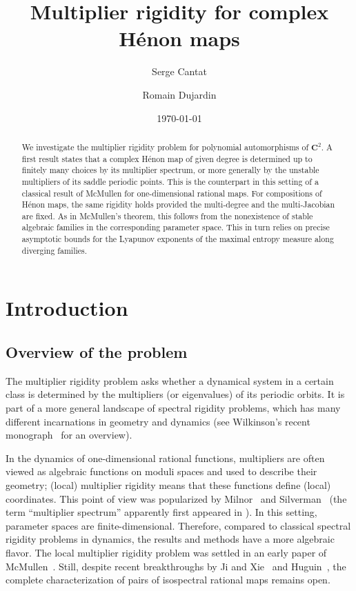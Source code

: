 \documentclass[oneside, 12pt]{amsart}
\title{Multiplier rigidity for complex Hénon maps}
\date{\today}
\author{Serge Cantat}
\author{Romain Dujardin}
\newcommand{\C}{\mathbf{C}}
\theoremstyle{plain}
\theoremstyle{definition}
\numberwithin{equation}{section}       %
\numberwithin{equation}{section}       %
\begin{document}
\setlength{\parskip}{.2em}
\setlength{\baselineskip}{1.26em}  


\begin{abstract}
We investigate the multiplier rigidity problem for polynomial automorphisms of $\C^2$.  
A first result states   that a 
complex Hénon map of given degree  is determined up to finitely many choices by its multiplier 
spectrum, or more generally by the unstable multipliers of its saddle periodic points. This is the counterpart in this setting of a classical result of McMullen for one-dimensional rational maps.
For compositions of 
Hénon maps, the same rigidity holds provided the multi-degree and the multi-Jacobian are fixed. 
As in McMullen’s theorem, this follows from the nonexistence of stable algebraic families in the corresponding parameter space. This  in turn relies on precise asymptotic bounds for the Lyapunov exponents of the maximal entropy measure along diverging families.
\end{abstract} 



\maketitle

\setcounter{tocdepth}{1}
\tableofcontents 

\section{Introduction}

\subsection{Overview of the problem}
The multiplier rigidity problem 
asks whether a dynamical system in a certain class  is determined by the 
multipliers (or eigenvalues) of its periodic orbits. It is part of a more general landscape 
 of spectral rigidity problems, which has many different  incarnations in geometry and dynamics (see 
Wilkinson's  recent monograph~\cite{wilkinson:book} for an overview). 

In the dynamics of one-dimensional rational functions, multipliers are often viewed as algebraic
  functions on moduli spaces and used to describe their geometry; %
  (local) 
  multiplier rigidity means that these functions define (local) coordinates.
     This point of view was %
     popularized by Milnor~\cite{milnor:quadratic, milnor:two_critical} 
 and Silverman~\cite{silverman:book} (the term ``multiplier spectrum'' apparently first appeared in 
 \cite{milnor:lattes}). 
 In this setting, parameter spaces are   finite-dimensional. Therefore, 
 compared to classical spectral rigidity problems  in dynamics, the results and 
 methods have a more algebraic flavor. The  local multiplier rigidity problem
 was settled in an early paper of McMullen~\cite{mcm:algorithms}.
  Still, despite   recent breakthroughs by Ji and Xie~\cite{ji-xie:multipliers, ji-xie:injective} 
  and Huguin~\cite{huguin:polynomials}, the complete characterization of pairs of isospectral 
 rational maps remains open. 
\end{document}
